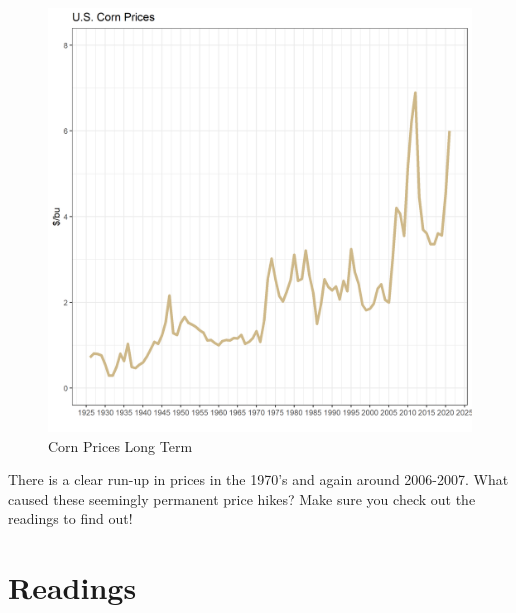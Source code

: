 \documentclass[
  letterpaper,
  DIV=11,
  numbers=noendperiod]{scrreprt}
\begin{document}
\begin{figure}[H]

{\centering \includegraphics{assets/PrimerforGrain_CornPrices.png}

}

\caption{Corn Prices Long Term}

\end{figure}%

There is a clear run-up in prices in the 1970's and again around
2006-2007. What caused these seemingly permanent price hikes? Make sure
you check out the readings to find out!

\section{Readings}\label{readings}
\end{document}
